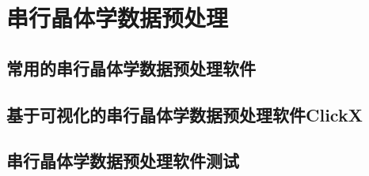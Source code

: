 \chapter{串行晶体学数据预处理}

\section{常用的串行晶体学数据预处理软件}

\section{基于可视化的串行晶体学数据预处理软件ClickX}

\section{串行晶体学数据预处理软件测试}